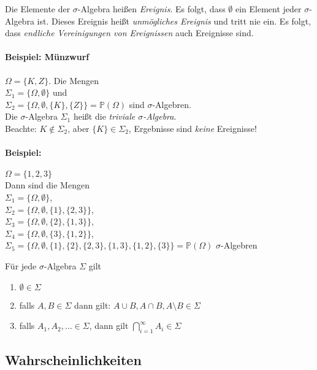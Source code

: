 Die Elemente der $\sigma$-Algebra heißen \emph{Ereignis}.
Es folgt, dass $\emptyset$ ein Element jeder $\sigma$-Algebra ist. Dieses Ereignis heißt
\emph{unmögliches Ereignis} und tritt nie ein.
Es folgt, dass \emph{endliche Vereinigungen von Ereignissen} auch Ereignisse sind.

\paragraph{Beispiel: Münzwurf}
$\Omega = \{K, Z\}$. Die Mengen\\
$\Sigma_1=\{\Omega, \emptyset\}$ und\\
$\Sigma_2=\{\Omega, \emptyset, \{K\}, \{Z\}\} = \mathbb{P}(\Omega)$ sind $\sigma$-Algebren.\\
Die $\sigma$-Algebra $\Sigma_1$ heißt die \emph{triviale $\sigma$-Algebra}.\\
Beachte: $K \notin \Sigma_2$, aber $\{K\} \in \Sigma_2$, Ergebnisse sind \emph{keine} Ereignisse!

\paragraph{Beispiel:} $\Omega = \{1,2,3\}$\\
Dann sind die Mengen\\
$\Sigma_1 = \{\Omega, \emptyset\}$,\\
$\Sigma_2 = \{\Omega, \emptyset, \{1\}, \{2,3\}\}$,\\
$\Sigma_3 = \{\Omega, \emptyset, \{2\}, \{1,3\}\}$,\\
$\Sigma_4 = \{\Omega, \emptyset, \{3\}, \{1,2\}\}$,\\
$\Sigma_5 = \{\Omega, \emptyset, \{1\}, \{2\}, \{2,3\}, \{1,3\}, \{1,2\}, \{3\} \} = \mathbb{P}(\Omega)$
$\sigma$-Algebren

\begin{theorem}
    Für jede $\sigma$-Algebra $\Sigma$ gilt
    \begin{enumerate}
        \item $\emptyset \in \Sigma$
        \item falls $A, B \in \Sigma$ dann gilt: $A \cup B, A \cap B, A \setminus B \in \Sigma$
        \item falls $A_1,A_2,\dots \in \Sigma$, dann gilt $\bigcap\limits_{i=1}^\infty A_i \in \Sigma$
    \end{enumerate}
\end{theorem}

\subsection{Wahrscheinlichkeiten}

